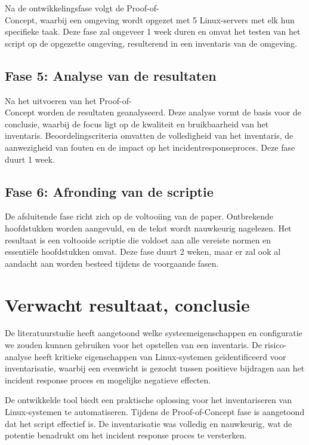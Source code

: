 Na de ontwikkelingsfase volgt de Proof-of-\\Concept, waarbij een omgeving wordt opgezet met 5 Linux-servers met elk hun specifieke taak.
Deze fase zal ongeveer 1 week duren en omvat het testen van het script op de opgezette omgeving, resulterend in een inventaris van de omgeving.

\subsection{Fase 5: Analyse van de resultaten}%
\label{sub:analyse_van_de_resultaten}

Na het uitvoeren van het Proof-of-\\Concept worden de resultaten geanalyseerd.
Deze analyse vormt de basis voor de conclusie, waarbij de focus ligt op de kwaliteit en bruikbaarheid van het inventaris.
Beoordelingscriteria omvatten de volledigheid van het inventaris, de aanwezigheid van fouten en de impact op het incidentresponseproces.
Deze fase duurt 1 week.

\subsection{Fase 6: Afronding van de scriptie}%
\label{sub:afronding_van_de_scriptie}

De afsluitende fase richt zich op de voltooiing van de paper.
Ontbrekende hoofdstukken worden aangevuld, en de tekst wordt nauwkeurig nagelezen.
Het resultaat is een voltooide scriptie die voldoet aan alle vereiste normen en essenti\"ele hoofdstukken omvat.
Deze fase duurt 2 weken, maar er zal ook al aandacht aan worden besteed tijdens de voorgaande fasen.

\section{Verwacht resultaat, conclusie}%
\label{sec:verwachte_resultaten}

De literatuurstudie heeft aangetoond welke systeemeigenschappen en configuratie we zouden kunnen gebruiken voor het opstellen van een inventaris.
De risico-analyse heeft kritieke eigenschappen van Linux-systemen ge\"identificeerd voor inventarisatie, waarbij een evenwicht is gezocht tussen positieve bijdragen aan het incident response proces en mogelijke negatieve effecten.

De ontwikkelde tool biedt een praktische oplossing voor het inventariseren van Linux-systemen te automatiseren.
Tijdens de Proof-of-Concept fase is aangetoond dat het script effectief is.
De inventarisatie was volledig en nauwkeurig, wat de potentie benadrukt om het incident response proces te versterken.

